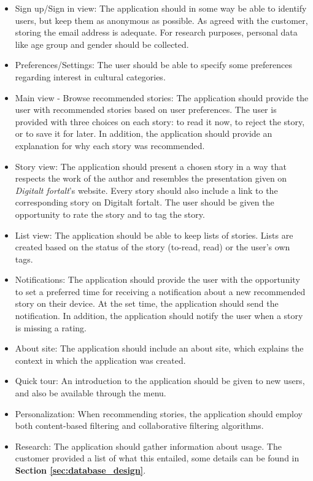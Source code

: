 \begin{itemize}
	\item Sign up/Sign in view: The application should in some way be able to identify users, but keep them as anonymous as possible. As agreed with the customer, storing the email address is adequate. For research purposes, personal data like age group and gender should be collected.
	
	\item Preferences/Settings: The user should be able to specify some preferences regarding interest in cultural categories.
	
	\item Main view - Browse recommended stories: The application should provide the user with recommended stories based on user preferences. The user is provided with three choices on each story: to read it now, to reject the story, or to save it for later. In addition, the application should provide an explanation for why each story was recommended.
	
	\item Story view: The application should present a chosen story in a way that respects the work of the author and resembles the presentation given on \textit{Digitalt fortalt}'s website. Every story should also include a link to the corresponding story on Digitalt fortalt. The user should be given the opportunity to rate the story and to tag the story. 
	
	\item List view: The application should be able to keep lists of stories. Lists are created based on the status of the story (to-read, read) or the user's own tags.
	
	\item Notifications: The application should provide the user with the opportunity to set a preferred time for receiving a notification about a new recommended story on their device. At the set time, the application should send the notification. In addition, the application should notify the user when a story is missing a rating.
	
	\item About site: The application should include an about site, which explains the context in which the application was created.
	
	\item Quick tour: An introduction to the application should be given to new users, and also be available through the menu.  
	
	\item Personalization: When recommending stories, the application should employ both content-based filtering and collaborative filtering algorithms.
	
	\item Research: The application should gather information about usage. The customer provided a list of what this entailed, some details can be found in \textbf{Section \ref{sec:database_design}}.
\end{itemize}


